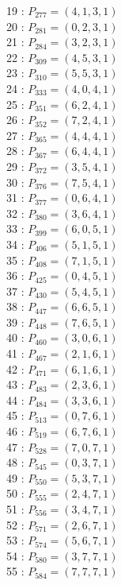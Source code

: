\documentclass{article}
\begin{document}
{\begin{multicols}{2}
19 : $P_{277}=( 4, 1, 3, 1 )$\\
20 : $P_{281}=( 0, 2, 3, 1 )$\\
21 : $P_{284}=( 3, 2, 3, 1 )$\\
22 : $P_{309}=( 4, 5, 3, 1 )$\\
23 : $P_{310}=( 5, 5, 3, 1 )$\\
24 : $P_{333}=( 4, 0, 4, 1 )$\\
25 : $P_{351}=( 6, 2, 4, 1 )$\\
26 : $P_{352}=( 7, 2, 4, 1 )$\\
27 : $P_{365}=( 4, 4, 4, 1 )$\\
28 : $P_{367}=( 6, 4, 4, 1 )$\\
29 : $P_{372}=( 3, 5, 4, 1 )$\\
30 : $P_{376}=( 7, 5, 4, 1 )$\\
31 : $P_{377}=( 0, 6, 4, 1 )$\\
32 : $P_{380}=( 3, 6, 4, 1 )$\\
33 : $P_{399}=( 6, 0, 5, 1 )$\\
34 : $P_{406}=( 5, 1, 5, 1 )$\\
35 : $P_{408}=( 7, 1, 5, 1 )$\\
36 : $P_{425}=( 0, 4, 5, 1 )$\\
37 : $P_{430}=( 5, 4, 5, 1 )$\\
38 : $P_{447}=( 6, 6, 5, 1 )$\\
39 : $P_{448}=( 7, 6, 5, 1 )$\\
40 : $P_{460}=( 3, 0, 6, 1 )$\\
41 : $P_{467}=( 2, 1, 6, 1 )$\\
42 : $P_{471}=( 6, 1, 6, 1 )$\\
43 : $P_{483}=( 2, 3, 6, 1 )$\\
44 : $P_{484}=( 3, 3, 6, 1 )$\\
45 : $P_{513}=( 0, 7, 6, 1 )$\\
46 : $P_{519}=( 6, 7, 6, 1 )$\\
47 : $P_{528}=( 7, 0, 7, 1 )$\\
48 : $P_{545}=( 0, 3, 7, 1 )$\\
49 : $P_{550}=( 5, 3, 7, 1 )$\\
50 : $P_{555}=( 2, 4, 7, 1 )$\\
51 : $P_{556}=( 3, 4, 7, 1 )$\\
52 : $P_{571}=( 2, 6, 7, 1 )$\\
53 : $P_{574}=( 5, 6, 7, 1 )$\\
54 : $P_{580}=( 3, 7, 7, 1 )$\\
55 : $P_{584}=( 7, 7, 7, 1 )$\\
\end{multicols}
}
\end{document}
